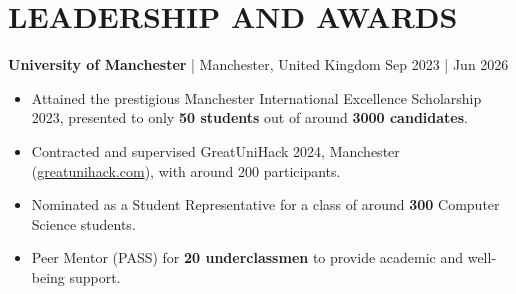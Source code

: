 \documentclass[a4paper,1.5pt]{extarticle}
\begin{document}





\section*{LEADERSHIP AND AWARDS}
\noindent
\textbf{University of Manchester} | Manchester, United Kingdom \hfill Sep 2023 | Jun 2026 %
\begin{itemize}
    \item Attained the prestigious Manchester International Excellence Scholarship 2023, presented to only \textbf{50 students} out of around \textbf{3000 candidates}.
    \item Contracted and supervised GreatUniHack 2024, Manchester (\href{https://www.greatunihack.com}{greatunihack.com}), with around 200 participants.
    \item Nominated as a Student Representative for a class of around \textbf{300} Computer Science students.
    \item Peer Mentor (PASS) for \textbf{20 underclassmen} to provide academic and well-being support.
\end{itemize}
\end{document}
